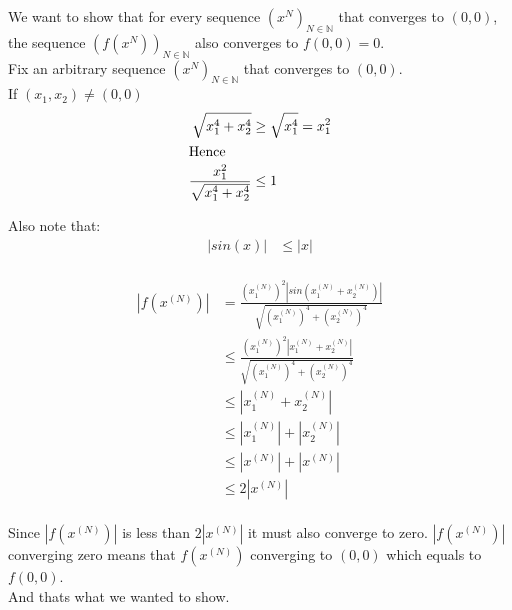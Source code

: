 \documentclass{article}
\begin{document}
We want to show that for every sequence \((x^N)_{N \in \mathbb{N}}\) that converges to \((0,0)\),
the sequence \((f(x^N))_{N \in \mathbb{N}}\) also converges to \(f(0,0)=0\).\\

Fix an arbitrary sequence \((x^N)_{N \in \mathbb{N}}\) that converges to \((0,0)\). \\
If \((x_1, x_2) \neq (0, 0)\)
\begin{align*}
   \sqrt{x_1^4 + x_2^4} &\geq \sqrt{x_1^4} = x_1^2 \\
   \intertext{Hence}
   \frac{x_1^2}{\sqrt{x_1^4 + x_2^4}} &\leq 1 \\
\end{align*}

Also note that:
\begin{align*}
   |sin(x)| &\leq |x| \\
\end{align*}

\begin{align*}
   |f(x^{(N)})| &= \frac{(x_1^{(N)})^2 |sin(x_1^{(N)}+x_2^{(N)})|}{\sqrt{(x_1^{(N)})^4 + (x_2^{(N)})^4}} \\
   &\leq \frac{(x_1^{(N)})^2 |x_1^{(N)}+x_2^{(N)}|}{\sqrt{(x_1^{(N)})^4 + (x_2^{(N)})^4}} \\
   &\leq |x_1^{(N)} + x_2^{(N)}| \\
   &\leq |x_1^{(N)}| + |x_2^{(N)}| \\
   &\leq |x^{(N)}| + |x^{(N)}| \\
   &\leq 2|x^{(N)}| \\
\end{align*}

Since \(|f(x^{(N)})|\) is less than \(2|x^{(N)}|\) it must also converge to zero. \(|f(x^{(N)})|\) converging zero means that
\(f(x^{(N)})\) converging to \((0, 0)\) which equals to \(f(0,0)\). \\
And thats what we wanted to show.
\end{document}
